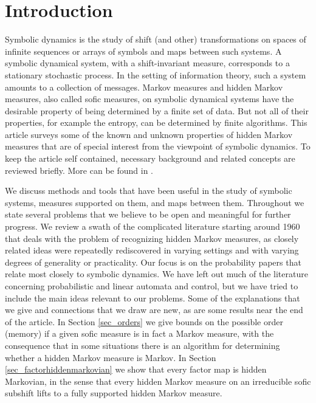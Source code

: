\documentclass{kepart2010}
\theoremstyle{plain}
\theoremstyle{definition}
\theoremstyle{remark}
\theoremstyle{definition}
\numberwithin{equation}{section}
\begin{document}
\section{Introduction}\label{sec_intro}

Symbolic dynamics is the study of shift (and other) transformations
on spaces of infinite sequences or arrays of symbols and maps
between such systems. A symbolic dynamical system, with a
shift-invariant measure, corresponds to a stationary stochastic
process. In the setting of information theory, such a system amounts
to a collection of messages. Markov measures and hidden Markov
measures, also called sofic measures, on symbolic dynamical systems
have the desirable property of being determined by a finite set of
data. But not all of their properties, for example the entropy, can
be determined by finite algorithms. This article surveys some of the
known and unknown properties of hidden Markov measures that are of
special interest from the viewpoint of symbolic dynamics. To keep
the article self contained, necessary background and related
concepts are reviewed briefly. More can be found in
\cite{LindMarcus1995, Petersen1989, Petersen1998, Walters1982}.

  We discuss methods and tools that have been useful in the study of
 symbolic systems, measures supported on them, and maps between
 them.
 Throughout we state several problems that we believe to be
 open and
meaningful for further progress.
 We review {a swath of }the complicated
literature starting around 1960 that deals with the problem of
recognizing hidden Markov measures, as
 closely related ideas were repeatedly rediscovered in varying
 settings and with varying degrees of generality or practicality.
 {Our focus is on the probability papers that relate most closely to
symbolic dynamics. We have left out much of the literature
concerning probabilistic and linear automata and control, but we
have tried to include the main ideas relevant to our problems.
  Some of the explanations that we give and connections that we
draw are new, as
 are some results near the end of the article.
 In Section \ref{sec_orders} we give bounds on the possible order (memory)
 if a given sofic measure is in fact a Markov measure,
  with the consequence that in some situations there is
  an algorithm for determining whether a hidden Markov measure is Markov.
 In Section \ref{sec_factorhiddenmarkovian} we show that every
 factor map is hidden Markovian, in the sense that every
 hidden Markov measure on an irreducible
 sofic subshift lifts to a fully supported hidden Markov measure.
}
\end{document}
